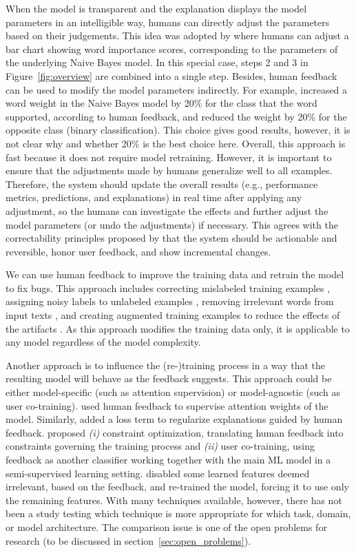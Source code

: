 When the model is transparent and the explanation displays the model parameters in an intelligible way, humans can directly adjust the parameters based on their judgements. This idea was adopted by  where humans can adjust a bar chart showing word importance scores, corresponding to the parameters of the underlying Naive Bayes model.
In this special case, steps 2 and 3 in Figure~\ref{fig:overview} are combined into a single step.
Besides, human feedback can be used to modify the model parameters indirectly. 
For example,  increased a word weight in the Naive Bayes model by 20\% for the class that the word supported, according to human feedback, and reduced the weight by 20\% for the opposite class (binary classification). 
This choice gives good results, however, 
it is not clear why and whether 20\% is the best choice here.
Overall, this approach is fast because it does not require model retraining. However, it is important to ensure that the adjustments made by humans generalize well to all examples.
Therefore, the system should update the overall results (e.g., performance metrics, predictions, and explanations) in real time after applying any adjustment, so the humans can investigate the effects and further adjust the model parameters (or undo the adjustments) if necessary. 
This agrees with the correctability principles proposed by  that the system should be actionable and reversible, honor user feedback, and show incremental changes.

We can use human feedback to improve the training data and retrain the model to fix bugs.
This approach includes 
correcting mislabeled training examples ,
assigning noisy labels to unlabeled examples , 
removing irrelevant words from input texts ,
and creating augmented training examples to reduce the effects of the artifacts .
As this approach modifies the training data only, it is applicable to any model regardless of the model complexity.

Another approach is to influence the (re-)training process in a way that the resulting model will behave as the feedback suggests.
This approach could be either model-specific (such as attention supervision) or model-agnostic (such as user co-training).
 used human feedback to supervise attention weights of the model.
Similarly,  added a loss term to regularize explanations guided by human feedback.
 proposed 
\textit{(i)} constraint optimization, translating human feedback into constraints governing the training process
and \textit{(ii)} 
user co-training, using feedback as another classifier working together with the main ML model in a semi-supervised learning setting.
 disabled some learned features deemed irrelevant, 
based on the feedback, and re-trained the model, forcing it to use only the remaining features.
With many techniques available, however, there has not been a study testing which technique is more appropriate for which task, domain, or model architecture. The comparison issue is one of the open problems for \EBHD research (to be discussed in section~\ref{sec:open_problems}).

